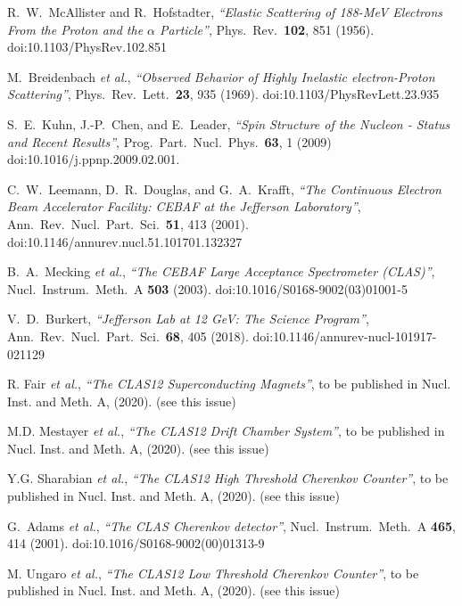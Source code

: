 \documentclass[final,3p,twocolumn]{elsarticle}
\begin{document}
\begin{thebibliography}{99}

  R.~W.~McAllister and R.~Hofstadter,
  {\it ``Elastic Scattering of 188-{\rm MeV} Electrons From the Proton and the $\alpha$ Particle''}, 
  Phys.\ Rev.\  {\bf 102}, 851 (1956).
  doi:10.1103/PhysRev.102.851

  M.~Breidenbach {\it et al.},
  {\it ``Observed Behavior of Highly Inelastic electron-Proton Scattering''},
  Phys.\ Rev.\ Lett.\  {\bf 23}, 935 (1969).
  doi:10.1103/PhysRevLett.23.935
  
  S.~E.~Kuhn, J.-P.~Chen, and E.~Leader,
  {\it ``Spin Structure of the Nucleon - Status and Recent Results''},
  Prog.\ Part.\ Nucl.\ Phys.\  {\bf 63}, 1 (2009)
  doi:10.1016/j.ppnp.2009.02.001.
 
  C.~W.~Leemann, D.~R.~Douglas, and G.~A.~Krafft,
  {\it ``The Continuous Electron Beam Accelerator Facility: CEBAF at the Jefferson Laboratory''},
  Ann.\ Rev.\ Nucl.\ Part.\ Sci.\  {\bf 51}, 413 (2001).
  doi:10.1146/annurev.nucl.51.101701.132327

  B.~A.~Mecking {\it et al.},
  {\it ``The CEBAF Large Acceptance Spectrometer (CLAS)''},
  Nucl.\ Instrum.\ Meth.\ A {\bf 503} (2003).
  doi:10.1016/S0168-9002(03)01001-5

  V.~D.~Burkert,
  {\it ``Jefferson Lab at 12 GeV: The Science Program''}, 
  Ann.\ Rev.\ Nucl.\ Part.\ Sci.\  {\bf 68}, 405 (2018).
  doi:10.1146/annurev-nucl-101917-021129 
  
R. Fair {\it et al.}, {\it ``The CLAS12 Superconducting Magnets''}, to be published in Nucl. Inst.
and Meth. A, (2020). (see this issue)

M.D. Mestayer {\it et al.}, {\it ``The CLAS12 Drift Chamber System''}, to be published in Nucl. Inst.
and Meth. A, (2020). (see this issue)

Y.G. Sharabian {\it et al.}, {\it ``The CLAS12 High Threshold Cherenkov Counter''}, to be published in Nucl. Inst.
and Meth. A, (2020). (see this issue)

G.~Adams {\it et al.}, {\it ``The CLAS Cherenkov detector''},
  Nucl.\ Instrum.\ Meth.\ A {\bf 465}, 414 (2001).
  doi:10.1016/S0168-9002(00)01313-9

M. Ungaro {\it et al.}, {\it ``The CLAS12 Low Threshold Cherenkov Counter''}, to be published in Nucl. Inst.
and Meth. A, (2020). (see this issue)


\end{thebibliography}
\end{document}
